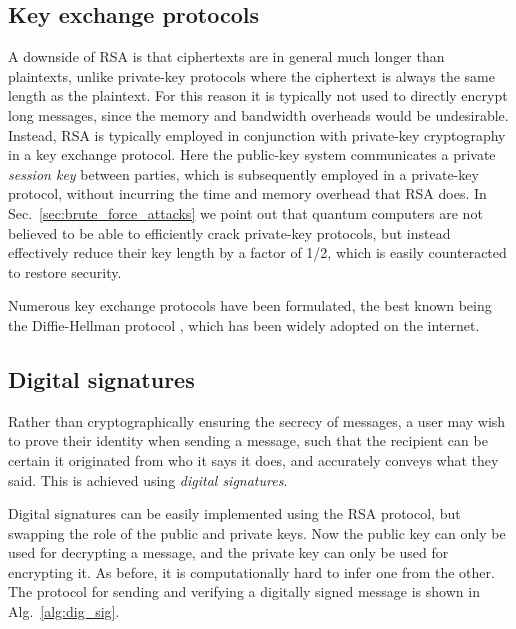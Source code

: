 %
%

\subsection{Key exchange protocols}

A downside of RSA is that ciphertexts are in general much longer than plaintexts, unlike private-key protocols where the ciphertext is always the same length as the plaintext. For this reason it is typically not used to directly encrypt long messages, since the memory and bandwidth overheads would be undesirable. Instead, RSA is typically employed in conjunction with private-key cryptography in a key exchange protocol. Here the public-key system communicates a private \textit{session key} between parties, which is subsequently employed in a private-key protocol, without incurring the time and memory overhead that RSA does. In Sec.~\ref{sec:brute_force_attacks} we point out that quantum computers are not believed to be able to efficiently crack private-key protocols, but instead effectively reduce their key length by a factor of 1/2, which is easily counteracted to restore security.

Numerous key exchange protocols have been formulated, the best known being the Diffie-Hellman protocol \cite{DiffieHellman}, which has been widely adopted on the internet.

%
%

\subsection{Digital signatures} \label{sec:dig_sig} 

Rather than cryptographically ensuring the secrecy of messages, a user may wish to prove their identity when sending a message, such that the recipient can be certain it originated from who it says it does, and accurately conveys what they said. This is achieved using \textit{digital signatures}.

Digital signatures can be easily implemented using the RSA protocol, but swapping the role of the public and private keys. Now the public key can only be used for decrypting a message, and the private key can only be used for encrypting it. As before, it is computationally hard to infer one from the other. The protocol for sending and verifying a digitally signed message is shown in Alg.~\ref{alg:dig_sig}.

